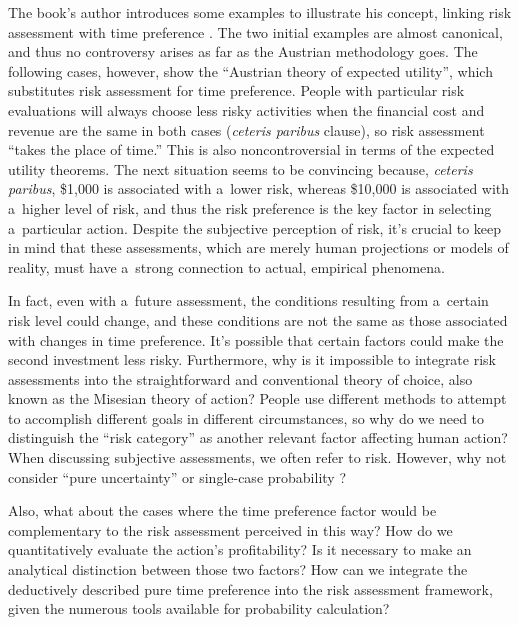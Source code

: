 The book's author introduces some examples 
\parencite[][pp.79–81]{megger_sprawiedliwosc_2021} %
 to illustrate his concept, linking risk assessment with time preference 
\parencites[][pp.476–486]{mises_human_1998}[][pp.13–17]{}. %
 The two initial examples are almost canonical, and thus no controversy arises as far as the Austrian methodology goes. The following cases, however, show the ``Austrian theory of expected utility'', which substitutes risk assessment for time preference. People with particular risk evaluations will always choose less risky activities when the financial cost and revenue are the same in both cases (\textit{ceteris paribus} clause), so risk assessment ``takes the place of time.'' This is also noncontroversial in terms of the expected utility theorems. The next situation seems to be convincing because, \textit{ceteris paribus}, \$1,000 is associated with a~lower risk, whereas \$10,000 is associated with a~higher level of risk, and thus the risk preference is the key factor in selecting a~particular action. Despite the subjective perception of risk, it's crucial to keep in mind that these assessments, which are merely human projections or models of reality, must have a~strong connection to actual, empirical phenomena.



In fact, even with a~future assessment, the conditions resulting from a~certain risk level could change, and these conditions are not the same as those associated with changes in time preference. It's possible that certain factors could make the second investment less risky. Furthermore, why is it impossible to integrate risk assessments into the straightforward and conventional theory of choice, also known as the Misesian theory of action? People use different methods to attempt to accomplish different goals in different circumstances, so why do we need to distinguish the ``risk category'' as another relevant factor affecting human action? When discussing subjective assessments, we often refer to risk. However, why not consider ``pure uncertainty'' or single-case probability 
\parencite[][pp.105–118]{mises_human_1998}?%




Also, what about the cases where the time preference factor would be complementary to the risk assessment perceived in this way? How do we quantitatively evaluate the action's profitability? Is it necessary to make an analytical distinction between those two factors? How can we integrate the deductively described pure time preference into the risk assessment framework, given the numerous tools available for probability calculation?



